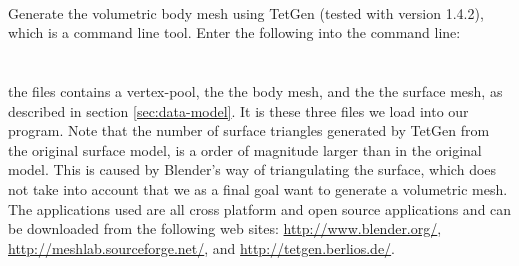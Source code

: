  \\

Generate the volumetric body mesh using TetGen (tested with
version 1.4.2), which is a command line tool. Enter the following into
the command line: \\

 \\

\\

the  files contains a vertex-pool, the  the
body mesh, and the  the surface mesh, as described in
section \vref{sec:data-model}. It is these three files we load into our
program.
Note that the number of surface triangles generated by TetGen from the
original surface model, is a order of magnitude larger than in the
original model. This is caused by Blender's way of triangulating the
surface, which does not take into account that we as a final goal want
to generate a volumetric mesh.
\\

The applications used are all cross platform and open source
applications and can be downloaded from the following web sites:
\url{http://www.blender.org/},
\url{http://meshlab.sourceforge.net/}, and
\url{http://tetgen.berlios.de/}.
